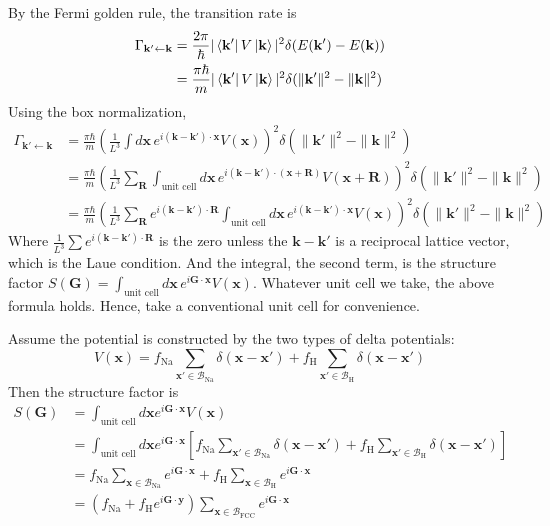 \documentclass[a4paper,11pt]{article}
\begin{document}
By the Fermi golden rule, the transition rate is
\begin{align}
    \Gamma_{\mathbf k'\leftarrow \mathbf k} 
    &= \frac{2\pi}{\hbar}|\bra{\mathbf k'}V\ket{\mathbf k}|^2\delta(E(\mathbf k')-E(\mathbf k)) \\
    &= \frac{\pi\hbar}{m}|\bra{\mathbf k'}V\ket{\mathbf k}|^2\delta(\|\mathbf k'\|^2-\|\mathbf k\|^2)
\end{align}
Using the box normalization,
\begin{align}
    \Gamma_{\mathbf k'\leftarrow \mathbf k} 
    &= \frac{\pi\hbar}{m}\left(\frac{1}{L^3}\int d\mathbf x\, e^{i(\mathbf k-\mathbf k')\cdot\mathbf x} V(\mathbf x)\right)^2\delta(\|\mathbf k'\|^2-\|\mathbf k\|^2) \\
    &= \frac{\pi\hbar}{m}\left(\frac{1}{L^3}\sum_{\mathbf R}\int_{\text{unit cell}} d\mathbf x\, e^{i(\mathbf k-\mathbf k')\cdot(\mathbf x+\mathbf R)} V(\mathbf x+\mathbf R)\right)^2\delta(\|\mathbf k'\|^2-\|\mathbf k\|^2) \\
    &= \frac{\pi\hbar}{m}\left(\frac{1}{L^3} \sum_{\mathbf R}e^{i(\mathbf k-\mathbf k')\cdot\mathbf R}\int_{\text{unit cell}} d\mathbf x\, e^{i(\mathbf k-\mathbf k')\cdot\mathbf x} V(\mathbf x)\right)^2\delta(\|\mathbf k'\|^2-\|\mathbf k\|^2)
\end{align}
Where $\frac{1}{L^3} \sum e^{i(\mathbf k-\mathbf k')\cdot\mathbf R}$ is the zero unless the $\mathbf k-\mathbf k'$ is a reciprocal lattice vector, which is the Laue condition. And the integral, the second term, is the structure factor $S(\mathbf G)=\int_{\text{unit cell}} d\mathbf x\, e^{i\mathbf G\cdot\mathbf x}V(\mathbf x)$. Whatever unit cell we take, the above formula holds. Hence, take a conventional unit cell for convenience.

Assume the potential is constructed by the two types of delta potentials: 
\begin{equation}
    V(\mathbf x)=f_{\mathrm{Na}}\sum_{\mathbf x'\in\mathcal B_{\mathrm{Na}}}\delta(\mathbf x-\mathbf x')+f_{\mathrm{H}}\sum_{\mathbf x'\in\mathcal B_{\mathrm{H}}}\delta(\mathbf x-\mathbf x')
\end{equation}
Then the structure factor is
\begin{align}
    S(\mathbf G)
    &=\int_{\text{unit cell}}d\mathbf x e^{i\mathbf G\cdot\mathbf x}V(\mathbf x) \\
    &=\int_{\text{unit cell}}d\mathbf x e^{i\mathbf G\cdot\mathbf x}\left[f_{\mathrm{Na}}\sum_{\mathbf x'\in\mathcal B_{\mathrm{Na}}}\delta(\mathbf x-\mathbf x')+f_{\mathrm{H}}\sum_{\mathbf x'\in\mathcal B_{\mathrm{H}}}\delta(\mathbf x-\mathbf x')\right]\\
    &=f_{\mathrm{Na}}\sum_{\mathbf x\in\mathcal B_{\mathrm{Na}}}e^{i\mathbf G\cdot\mathbf x}+f_{\mathrm{H}}\sum_{\mathbf x\in\mathcal B_{\mathrm{H}}}e^{i\mathbf G\cdot\mathbf x} \\
    &=(f_{\mathrm{Na}} + f_{\mathrm{H}}e^{i\mathbf G\cdot \mathbf y})\sum_{\mathbf x\in\mathcal B_{\mathrm{FCC}}}e^{i\mathbf G\cdot\mathbf x}
\end{align}
\end{document}

